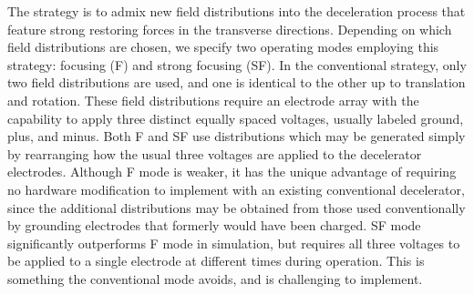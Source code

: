 \documentclass[%
 reprint,
 amsmath,amssymb,
 aps,
prl,
]{revtex4-1}
\begin{document}
The strategy is to admix new field distributions into the deceleration process that feature strong restoring forces in the transverse directions.
Depending on which field distributions are chosen, we specify two operating modes employing this strategy: focusing (F) and strong focusing (SF).
In the conventional strategy, only two field distributions are used, and one is identical to the other up to translation and rotation.
These field distributions require an electrode array with the capability to apply three distinct equally spaced voltages, usually labeled ground, plus, and minus.
Both F and SF use distributions which may be generated simply by rearranging how the usual three voltages are applied to the decelerator electrodes.
Although F mode is weaker, it has the unique advantage of requiring no hardware modification to implement with an existing conventional decelerator, since the additional distributions may be obtained from those used conventionally by grounding electrodes that formerly would have been charged.
SF mode significantly outperforms F mode in simulation, but requires all three voltages to be applied to a single electrode at different times during operation.
This is something the conventional mode avoids, and is challenging to implement.
\end{document}
